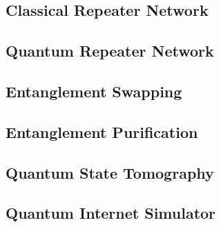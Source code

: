 \subsection{Classical Repeater Network}
\subsection{Quantum Repeater Network}
\subsection{Entanglement Swapping}
\subsection{Entanglement Purification}
\subsection{Quantum State Tomography}
\subsection{Quantum Internet Simulator}
\cite{satoh2021quisp}

